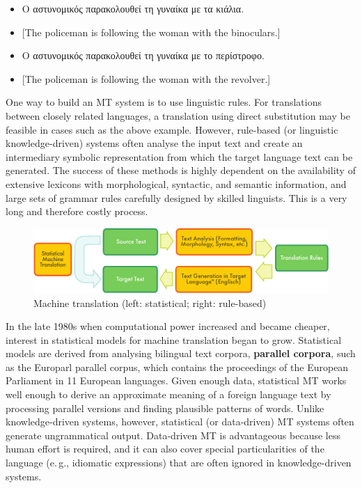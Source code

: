 \documentclass[]{../../metanetpaper}
\begin{document}
\begin{multicols}{2}
\begin{itemize}
\item Ο αστυνομικός παρακολουθεί τη γυναίκα με τα κιάλια.
\item {[}The policeman is following the woman with the binoculars.{]} 
\item Ο αστυνομικός παρακολουθεί τη γυναίκα με το περίστροφο.
\item {[}The policeman is following the woman with the revolver.{]}
\end{itemize}

One way to build an MT system is to use linguistic rules. For translations between closely related languages, a translation using direct substitution may be feasible in cases such as the above example. However, rule-based (or linguistic knowledge-driven) systems often analyse the input text and create an intermediary symbolic representation from which the target language text can be generated. The success of these methods is highly dependent on the availability of extensive lexicons with morphological, syntactic, and semantic information, and large sets of grammar rules carefully designed by skilled linguists. This is a very long and therefore costly process.

\begin{figure}[htb]
  \center
  \includegraphics[width=\textwidth]{../_media/english/machine_translation}
  \caption{Machine translation (left: statistical; right: rule-based)}
  \label{fig:mtarch_en}
\end{figure}
 
In the late 1980s when computational power increased and became cheaper, interest in statistical models for machine translation began to grow. Statistical models are derived from analysing bilingual text corpora, \textbf{parallel corpora}, such as the Europarl parallel corpus, which contains the proceedings of the European Parliament in 11 European languages. Given enough data, statistical MT works well enough to derive an approximate meaning of a foreign language text by processing parallel versions and finding plausible patterns of words. Unlike knowledge-driven systems, however, statistical (or data-driven) MT systems often generate ungrammatical output. Data-driven MT is advantageous because less human effort is required, and it can also cover special particularities of the language (e.\,g., idiomatic expressions) that are often ignored in knowledge-driven systems. 


\end{multicols}
\end{document}
